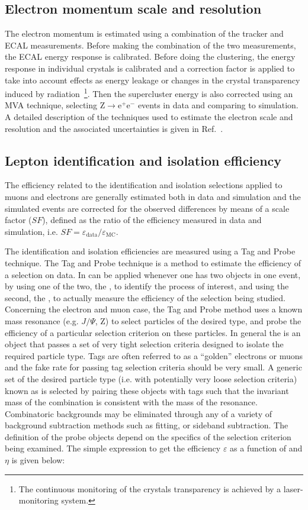 \subsection{Electron momentum scale and resolution}
The electron momentum is estimated using a combination of the tracker and ECAL measurements. Before making the combination of the two measurements, the ECAL energy response is calibrated. Before doing the clustering, the energy response in individual crystals is calibrated and a correction factor is applied to take into account effects as energy leakage or changes in the crystal transparency induced by radiation~\footnote{The continuous monitoring of the crystals transparency is achieved by a laser-monitoring system.}. Then the supercluster energy is also corrected using an MVA technique, selecting Z$\to\mathrm{e^+ e^-}$ events in data and comparing to simulation. A detailed description of the techniques used to estimate the electron scale and resolution and the associated uncertainties is given in Ref.~\cite{Khachatryan:2015hwa}.



\subsection{Lepton identification and isolation efficiency}\label{sec:lepIdIsoEff}
The efficiency related to the identification and isolation selections applied to muons and electrons are generally estimated both in data and simulation and the simulated events are corrected for the observed differences by means of a scale factor ($SF$), defined as the ratio of the efficiency measured in data and simulation, i.e. $SF = \varepsilon_\mathrm{data}/\varepsilon_\mathrm{MC}$.

The identification and isolation efficiencies are measured using a Tag and Probe technique. 
The Tag and Probe technique is a method to estimate the efficiency of a selection on data. In can be applied whenever one has two objects in one event, by using one of the two, the \tg{}, to identify the process of interest, and using the second, the \probe{}, to actually measure the efficiency of the selection being studied.
Concerning the electron and muon case, the Tag and Probe method uses a known mass resonance (e.g. $J/\Psi$, Z) to select particles of the desired type, and probe the efficiency of a particular selection criterion on these particles. In general the \tg{} is an object that passes a set of very tight selection criteria designed to isolate the required particle type. Tags are often referred to as a ``golden'' electrons or muons and the fake rate for passing tag selection criteria should be very small. A generic set of the desired particle type (i.e. with potentially very loose selection criteria) known as \probe{} is selected by pairing these objects with tags such that the invariant mass of the combination is consistent with the mass of the resonance. Combinatoric backgrounds may be eliminated through any of a variety of background subtraction methods such as fitting, or sideband subtraction. The definition of the probe objects depend on the specifics of the selection criterion being examined. The simple expression to get the efficiency $\varepsilon$ as a function of \pt and $\eta$ is given below:

